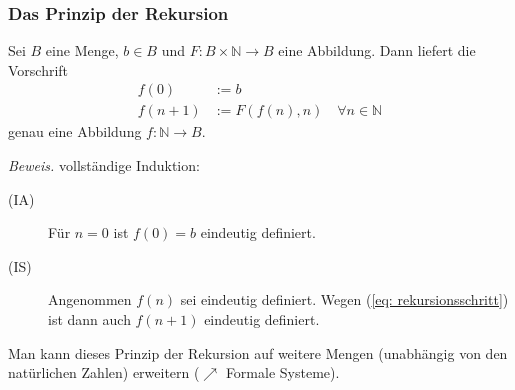 \documentclass{beamer}
\begin{document}
	\begin{frame}\frametitle{Das Prinzip der Rekursion}
		\footnotesize
		\begin{theorem}
			Sei $B$ eine Menge, $b \in B$ und $F \colon B \times \mathbb{N} \to B$ eine Abbildung. Dann liefert die Vorschrift
			\begin{subequations}
				\begin{align}
				f(0) &:= b \\
				f(n+1) &:= F(f(n),n) \quad \forall n \in \mathbb{N} \label{eq: rekursionsschritt}
				\end{align}
			\end{subequations}
			genau eine Abbildung $f : \mathbb{N} \to B$.
		\end{theorem}
		\pause
		
		\emph{Beweis.} \qquad vollständige Induktion:
		\begin{description}
			\item[(IA)] Für $n=0$ ist $f(0) = b$ eindeutig definiert.
			\item[(IS)] Angenommen $f(n)$ sei eindeutig definiert. Wegen (\ref{eq: rekursionsschritt}) ist dann auch $f(n+1)$ eindeutig definiert.
		\end{description}
		
		\bigskip
		
		Man kann dieses Prinzip der Rekursion auf weitere Mengen (unabhängig von den natürlichen Zahlen) erweitern ($\nearrow$ Formale Systeme).
	\end{frame}
	
\end{document}
